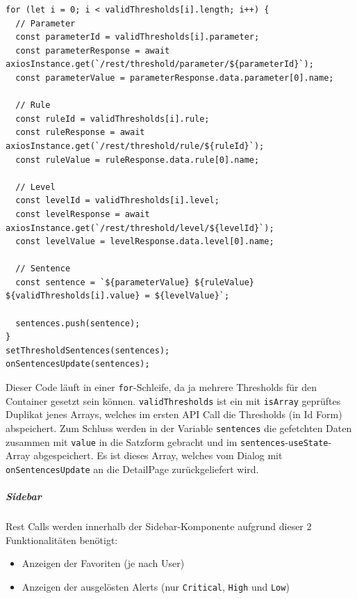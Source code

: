 \documentclass[
    headings=optiontotocandhead,%
    twoside,
    numbers=noenddot,%
    12pt, %
    titlepage, %
    parskip=full, %
    listof=leveldown, 
    numbers=noenddot, %
    a4paper,DIV=14,
    BCOR=15mm,
]{scrbook}
\newcommand{\passthrough}[1]{#1}
\providecommand{\tightlist}{%
  \setlength{\itemsep}{0pt}\setlength{\parskip}{0pt}}
\begin{document}
\begin{lstlisting}[caption={Fetchen von Namen der Threshold-Bestandteile mit ihrer Id}]
for (let i = 0; i < validThresholds[i].length; i++) {
  // Parameter
  const parameterId = validThresholds[i].parameter;
  const parameterResponse = await axiosInstance.get(`/rest/threshold/parameter/${parameterId}`);
  const parameterValue = parameterResponse.data.parameter[0].name;

  // Rule
  const ruleId = validThresholds[i].rule;
  const ruleResponse = await axiosInstance.get(`/rest/threshold/rule/${ruleId}`);
  const ruleValue = ruleResponse.data.rule[0].name;

  // Level
  const levelId = validThresholds[i].level;
  const levelResponse = await axiosInstance.get(`/rest/threshold/level/${levelId}`);
  const levelValue = levelResponse.data.level[0].name;

  // Sentence
  const sentence = `${parameterValue} ${ruleValue} ${validThresholds[i].value} = ${levelValue}`;
  
  sentences.push(sentence);
}
setThresholdSentences(sentences);
onSentencesUpdate(sentences);
\end{lstlisting}

Dieser Code läuft in einer \passthrough{\lstinline!for!}-Schleife, da ja
mehrere Thresholds für den Container gesetzt sein können.
\passthrough{\lstinline!validThresholds!} ist ein mit
\passthrough{\lstinline!isArray!} geprüftes Duplikat jenes Arrays,
welches im ersten API Call die Thresholds (in Id Form) abspeichert. Zum
Schluss werden in der Variable \passthrough{\lstinline!sentences!} die
gefetchten Daten zusammen mit \passthrough{\lstinline!value!} in die
Satzform gebracht und im
\passthrough{\lstinline!sentences!}-\passthrough{\lstinline!useState!}-Array
abgespeichert. Es ist dieses Array, welches vom Dialog mit
\passthrough{\lstinline!onSentencesUpdate!} an die DetailPage
zurückgeliefert wird.

\hypertarget{sidebar-1}{%
\subparagraph{Sidebar}\label{sidebar-1}}

Rest Calls werden innerhalb der Sidebar-Komponente aufgrund dieser 2
Funktionalitäten benötigt:

\begin{itemize}
\tightlist
\item
  Anzeigen der Favoriten (je nach User)
\item
  Anzeigen der ausgelösten Alerts (nur
  \passthrough{\lstinline!Critical!}, \passthrough{\lstinline!High!} und
  \passthrough{\lstinline!Low!})
\end{itemize}
\end{document}
